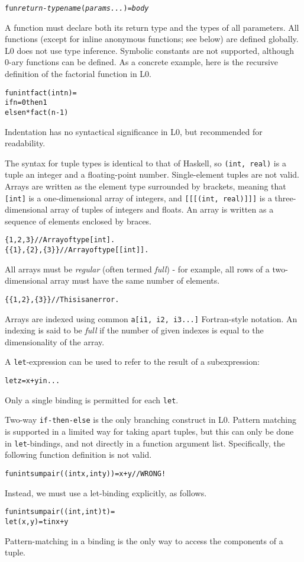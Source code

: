 \documentclass[oneside]{memoir}
\begin{document}
\begin{alltt}
  fun \textit{return-type} \textit{name}(\textit{params...}) = \textit{body}
\end{alltt}

A function must declare both its return type and the types of all
parameters.  All functions (except for inline anonymous functions; see
below) are defined globally.  L0 does not use type inference.
Symbolic constants are not supported, although 0-ary functions can be
defined.  As a concrete example, here is the recursive definition of
the factorial function in L0.
\begin{alltt}
  fun int fact(int n) =
  if n = 0 then 1
           else n * fact(n-1)
\end{alltt}
Indentation has no syntactical significance in L0, but recommended for
readability.

The syntax for tuple types is identical to that of Haskell, so
\texttt{(int, real)} is a tuple an integer and a floating-point
number.  Single-element tuples are not valid.  Arrays are written as
the element type surrounded by brackets, meaning that \texttt{[int]}
is a one-dimensional array of integers, and \texttt{[[[(int, real)]]]}
is a three-dimensional array of tuples of integers and floats.  An
array is written as a sequence of elements enclosed by braces.
\begin{alltt}
  \{1, 2, 3\}       // Array of type [int].
  \{\{1\}, \{2\}, \{3\}\} // Array of type [[int]].
\end{alltt}
All arrays must be \emph{regular} (often termed \emph{full}) - for
example, all rows of a two-dimensional array must have the same number
of elements.
\begin{alltt}
  \{\{1, 2\}, \{3\}\} // This is an error.
\end{alltt}
Arrays are indexed using common \texttt{a[i1, i2, i3...]}
Fortran-style notation.  An indexing is said to be \textit{full} if
the number of given indexes is equal to the dimensionality of the
array.

A \texttt{let}-expression can be used to refer to the result of a
subexpression:
\begin{alltt}
  let z = x + y in ...
\end{alltt}
Only a single binding is permitted for each \texttt{let}.

Two-way \texttt{if-then-else} is the only branching construct in L0.
Pattern matching is supported in a limited way for taking apart
tuples, but this can only be done in \texttt{let}-bindings, and not
directly in a function argument list.  Specifically, the following
function definition is not valid.
\begin{alltt}
  fun int sumpair((int x, int y)) = x + y // WRONG!
\end{alltt}
Instead, we must use a let-binding explicitly, as follows.
\begin{alltt}
  fun int sumpair((int, int) t) =
    let (x,y) = t in x + y
\end{alltt}
Pattern-matching in a binding is the only way to access the components
of a tuple.
\end{document}
